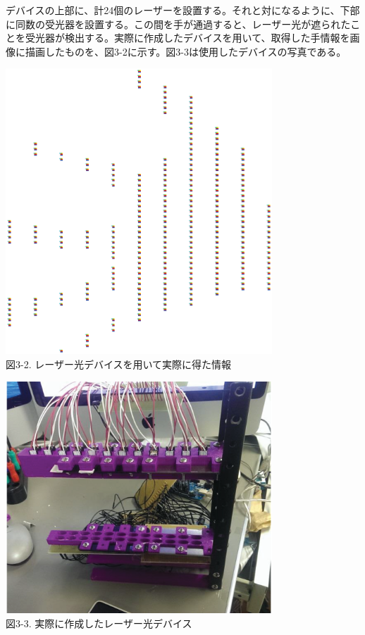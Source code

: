 デバイスの上部に、計24個のレーザーを設置する。それと対になるように、下部に同数の受光器を設置する。この間を手が通過すると、レーザー光が遮られたことを受光器が検出する。実際に作成したデバイスを用いて、取得した手情報を画像に描画したものを、図3-2に示す。図3-3は使用したデバイスの写真である。

\begin{center}
  \includegraphics[width=10cm]{RazerDevice_getInfo.eps} \\

 \vspace{1mm}
  図3-2. レーザー光デバイスを用いて実際に得た情報
\end{center}

 \vspace{5mm}

\begin{center}
  \includegraphics[width=10cm]{RazerDevice_real_color.eps} \\

 \vspace{1mm}
  図3-3. 実際に作成したレーザー光デバイス
\end{center}

